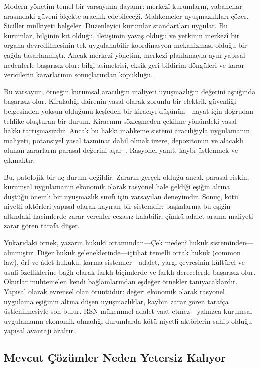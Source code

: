 \documentclass[11pt,a4paper,twocolumn]{article}
\begin{document}
Modern yönetim temel bir varsayıma dayanır: merkezî kurumların, yabancılar arasındaki güveni ölçekte aracılık edebileceği. Mahkemeler uyuşmazlıkları çözer. Siciller mülkiyeti belgeler. Düzenleyici kurumlar standartları uygular. Bu kurumlar, bilginin kıt olduğu, iletişimin yavaş olduğu ve yetkinin merkezî bir organa devredilmesinin tek uygulanabilir koordinasyon mekanizması olduğu bir çağda tasarlanmıştı. Ancak merkezî yönetim, merkezî planlamayla aynı yapısal nedenlerle başarısız olur: bilgi asimetrisi, eksik geri bildirim döngüleri ve karar vericilerin kararlarının sonuçlarından kopukluğu.

Bu varsayım, örneğin kurumsal aracılığın maliyeti uyuşmazlığın değerini aştığında başarısız olur. Kiraladığı dairenin yasal olarak zorunlu bir elektrik güvenliği belgesinden yoksun olduğunu keşfeden bir kiracıyı düşünün---hayat için doğrudan tehlike oluşturan bir durum. Kiracının sözleşmeden çekilme yönündeki yasal hakkı tartışmasızdır. Ancak bu hakkı mahkeme sistemi aracılığıyla uygulamanın maliyeti, potansiyel yasal tazminat dahil olmak üzere, depozitonun ve alacaklı olunan zararların parasal değerini aşar~\cite{czcourtfees}. Rasyonel yanıt, kaybı üstlenmek ve çıkmaktır.

Bu, patolojik bir uç durum değildir. Zararın gerçek olduğu ancak parasal riskin, kurumsal uygulamanın ekonomik olarak rasyonel hale geldiği eşiğin altına düştüğü önemli bir uyuşmazlık sınıfı için varsayılan deneyimdir. Sonuç, kötü niyetli aktörleri yapısal olarak kayıran bir sistemdir: başkalarına bu eşiğin altındaki hacimlerde zarar verenler cezasız kalabilir, çünkü adalet arama maliyeti zarar gören tarafa düşer.

Yukarıdaki örnek, yazarın hukukî ortamından---Çek medenî hukuk sisteminden---alınmıştır. Diğer hukuk geleneklerinde---içtihat temelli ortak hukuk (common law), örf ve âdet hukuku, karma sistemler---adalet, yargı çevresinin kültürel ve usulî özelliklerine bağlı olarak farklı biçimlerde ve farklı derecelerde başarısız olur. Okurlar muhtemelen kendi bağlamlarından eşdeğer örnekler tanıyacaklardır. Yapısal olarak evrensel olan örüntüdür: değeri ekonomik olarak rasyonel uygulama eşiğinin altına düşen uyuşmazlıklar, kaybın zarar gören tarafça üstlenilmesiyle son bulur. RSN mükemmel adalet vaat etmez---yalnızca kurumsal uygulamanın ekonomik olmadığı durumlarda kötü niyetli aktörlerin sahip olduğu yapısal avantajı azaltır.

\subsection{Mevcut Çözümler Neden Yetersiz Kalıyor}
\end{document}
